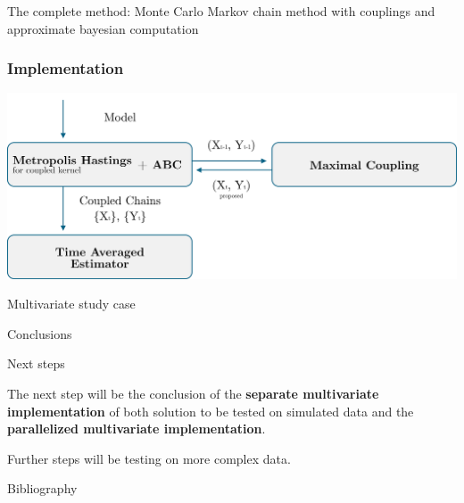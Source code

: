 \documentclass{beamer}
\begin{document}
\begin{section}{The complete method: Monte Carlo Markov chain method with couplings and approximate bayesian computation}
	
	\begin{frame}[plain]{}
		\sectionpage
	\end{frame}

	\begin{frame}
		\frametitle{Implementation}
		\begin{center}
			\includegraphics[width=\textwidth]{img/Bayes3}
		\end{center}
	\end{frame}


\end{section}


\begin{section}{Multivariate study case}
	\begin{frame}[plain]{}
		\sectionpage
	\end{frame}
\end{section}


\begin{section}{Conclusions}
	
    \begin{frame}[plain]{}
		\sectionpage
	\end{frame}

	\begin{frame}{Next steps}
	
		The next step will be the conclusion of the \textbf{separate multivariate implementation} of both solution to be tested on simulated data and the \textbf{parallelized multivariate implementation}.
		
		\vspace{0.5 cm}
		Further steps will be testing on more complex data.
	\end{frame}

	\begin{frame}{Bibliography}
		\nocite{*}
		
		\tiny{  }

	

	\end{frame}
\end{section}
\end{document}
